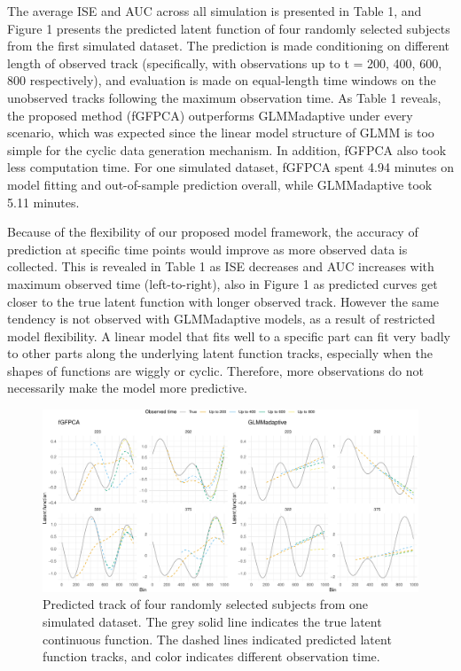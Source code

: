 \documentclass[
  11pt,
]{article}
\begin{document}
The average ISE and AUC across all simulation is presented in Table 1,
and Figure 1 presents the predicted latent function of four randomly
selected subjects from the first simulated dataset. The prediction is
made conditioning on different length of observed track (specifically,
with observations up to t = 200, 400, 600, 800 respectively), and
evaluation is made on equal-length time windows on the unobserved tracks
following the maximum observation time. As Table 1 reveals, the proposed
method (fGFPCA) outperforms GLMMadaptive under every scenario, which was
expected since the linear model structure of GLMM is too simple for the
cyclic data generation mechanism. In addition, fGFPCA also took less
computation time. For one simulated dataset, fGFPCA spent 4.94 minutes
on model fitting and out-of-sample prediction overall, while
GLMMadaptive took 5.11 minutes.

Because of the flexibility of our proposed model framework, the accuracy
of prediction at specific time points would improve as more observed
data is collected. This is revealed in Table 1 as ISE decreases and AUC
increases with maximum observed time (left-to-right), also in Figure 1
as predicted curves get closer to the true latent function with longer
observed track. However the same tendency is not observed with
GLMMadaptive models, as a result of restricted model flexibility. A
linear model that fits well to a specific part can fit very badly to
other parts along the underlying latent function tracks, especially when
the shapes of functions are wiggly or cyclic. Therefore, more
observations do not necessarily make the model more predictive.

\begin{figure}
\centering
\includegraphics{Manuscript_edit_files/figure-latex/Figure-1.pdf}
\caption{Predicted track of four randomly selected subjects from one
simulated dataset. The grey solid line indicates the true latent
continuous function. The dashed lines indicated predicted latent
function tracks, and color indicates different observation time.}
\end{figure}
\end{document}
